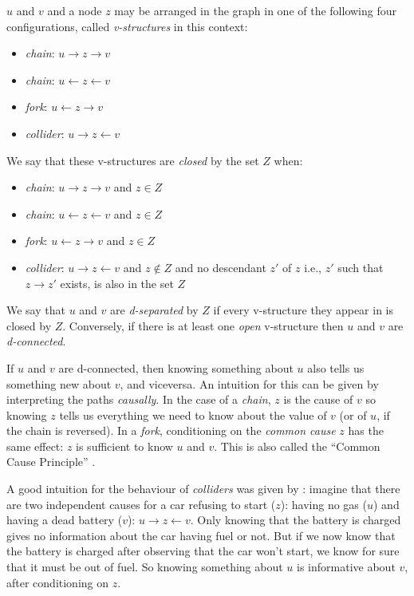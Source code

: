 $u$ and $v$ and a node $z$ may be arranged in the graph in one of the following four configurations, called \textit{v-structures} in this context:
\begin{itemize}
  \item \textit{chain}: $u \rightarrow z \rightarrow v$
  \item \textit{chain}: $u \leftarrow z \leftarrow v$
  \item \textit{fork}: $u \leftarrow z \rightarrow v$
  \item \textit{collider}: $u \rightarrow z \leftarrow v$
\end{itemize}

We say that these v-structures are \textit{closed} by the set $Z$ when:
\begin{itemize}
  \item \textit{chain}: $u \rightarrow z \rightarrow v$ and $z \in Z$
  \item \textit{chain}: $u \leftarrow z \leftarrow v$ and $z \in Z$
  \item \textit{fork}: $u \leftarrow z \rightarrow v$ and $z \in Z$
  \item \textit{collider}: $u \rightarrow z \leftarrow v$ and $z \notin Z$ and no descendant $z'$ of $z$ i.e., $z'$ such that $z \rightarrow z'$ exists, is also in the set $Z$
\end{itemize}

We say that $u$ and $v$ are \textit{d-separated} by $Z$ if every v-structure they appear in is closed by $Z$.
Conversely, if there is at least one \textit{open} v-structure then $u$ and $v$ are \textit{d-connected}.

If $u$ and $v$ are d-connected, then knowing something about $u$ also tells us something new about $v$, and viceversa.
An intuition for this can be given by interpreting the paths \textit{causally}.
In the case of a \textit{chain}, $z$ is the cause of $v$ so knowing $z$ tells us everything we need to know about the value of $v$ (or of $u$, if the chain is reversed).
In a \textit{fork}, conditioning on the \textit{common cause} $z$ has the same effect: $z$ is sufficient to know $u$ and $v$.
This is also called the \enquote{Common Cause Principle} \citep{sober1988principle}.

A good intuition for the behaviour of \textit{colliders} was given by \citet{Pearl1988}: imagine that there are two independent causes for a car refusing to start ($z$): having no gas ($u$) and having a dead battery ($v$): $u \rightarrow z \leftarrow  v$.
Only knowing that the battery is charged gives no information about the car having fuel or not.
But if we now know that the battery is charged after observing that the car won't start, we know for sure that it must be out of fuel.
So knowing something about $u$ is informative about $v$, after conditioning on $z$.

